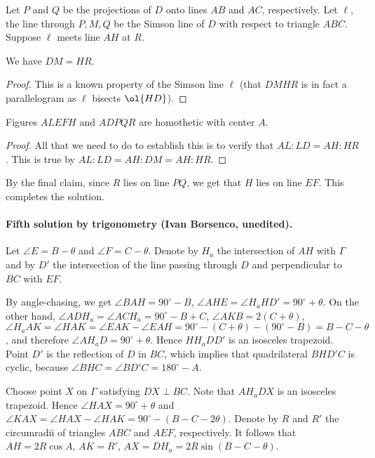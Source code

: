 Let $P$ and $Q$ be the projections of $D$ onto lines $AB$ and $AC$, respectively.
Let $\ell$, the line through $P, M, Q$ be the Simson line of $D$ with respect to triangle $ABC$. Suppose $\ell$ meets line $AH$ at $R$.
\begin{claim*}
  We have $DM = HR$.
\end{claim*}
\begin{proof}
  This is a known property of the Simson line $\ell$
  (that $DMHR$ is in fact a parallelogram as $\ell$ bisects $\ol{HD}$).
\end{proof}

\begin{claim*}
  Figures $ALEFH$ and $ADPQR$ are homothetic with center $A$.
\end{claim*}
\begin{proof}
  All that we need to do to establish this is to verify that $AL : LD = AH : HR$.
  This is true by $AL : LD= AH : DM= AH : HR$.
\end{proof}
By the final claim, since $R$ lies on line $PQ$,
we get that $H$ lies on line $EF$. This completes the solution.


\paragraph{Fifth solution by trigonometry (Ivan Borsenco, unedited).}
Let $\angle E = B- \theta$ and $\angle F= C - \theta$.
Denote by $H_a$ the intersection of $AH$ with  $\Gamma$
and by $D'$ the intersection of the line passing through $D$ and perpendicular to $BC$ with $EF$.

By angle-chasing, we get $\angle BAH= 90^{\circ} - B$, $\angle AHE = \angle H_aHD' = 90^{\circ}+\theta$.
On the other hand, $\angle ADH_a= \angle ACH_a= 90^{\circ}-B+C$, $\angle AKB = 2(C+\theta)$,
$\angle H_aAK = \angle HAK = \angle EAK - \angle EAH = 90^{\circ}-(C+\theta) - (90 ^{\circ}- B)= B-C- \theta$,
and therefore $\angle AH_aD = 90^{\circ}+\theta$. Hence $HH_aDD'$ is an isosceles trapezoid.
Point $D'$ is the reflection of $D$ in $BC$, which implies that quadrilateral $BHD'C$ is cyclic, because $\angle BHC = \angle BD'C =
180^{\circ} -A$.

Choose point $X$ on $\Gamma$ satisfying $DX \perp BC$.
Note that $AH_aDX$ is an isosceles trapezoid. Hence $\angle HAX = 90^{\circ}+\theta$
and $\angle KAX = \angle HAX -\angle HAK =90^{\circ}-(B-C-2\theta)$.
Denote by $R$ and $R'$ the circumradii of triangles $ABC$ and $AEF$, respectively.
It follows that $AH =2R \cos A$, $AK = R'$, $AX = DH_a= 2R \sin (B-C- \theta)$.

